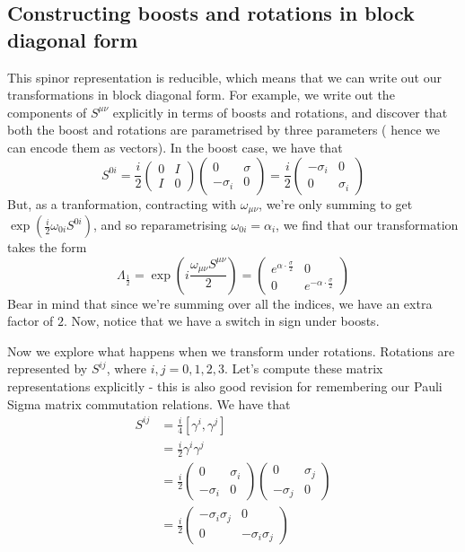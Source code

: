 \subsection{Constructing boosts and rotations in block diagonal form} 
This spinor representation is reducible, which means that we can write out our transformations in block diagonal form. For example, we write out the components of $S^{ \mu \nu } $ explicitly in terms of boosts and rotations, and discover that both the boost and rotations are parametrised by three parameters ( hence we can encode them as vectors). In the boost case, we have that \[ S^{ 0i } = \frac{ i }{2} \begin{pmatrix} 0 & I \\ I & 0 \end{pmatrix} \begin{pmatrix} 0 & \sigma \\ - \sigma_i & 0 \end{pmatrix}  = \frac{i}{2} \begin{pmatrix} - \sigma_i & 0 \\ 0 & \sigma_i \end{pmatrix} \] But, as a tranformation, contracting with $ \omega_{ \mu \nu} $, we're only summing to get $\exp ( \frac{i }{2} \omega_{ 0i }S^{ 0i } )$, and so reparametrising $\omega_{ 0i } = \alpha_i$, we find that our transformation takes the form 
\[ \Lambda_{ \frac{1}{2}}  = \exp \left(i \frac{ \omega_{ \mu \nu} S^{\mu \nu}}{2} \right)  = \begin{pmatrix} e^{ \alpha \cdot \frac{ \sigma}{2} } & 0 \\ 0 & e^{  - \alpha \cdot \frac{\sigma}{2}} \end{pmatrix} \] 
Bear in mind that since we're summing over all the indices, we have an extra factor of $2$. Now, notice that we have a switch in sign under boosts.   

Now we explore what happens when we transform under rotations. Rotations are represented by $S^{ij} $, where $i, j = 0, 1, 2, 3$. Let's compute these matrix representations explicitly - this is also good revision for remembering our Pauli Sigma matrix commutation relations. We have that 
\begin{align*} 
S^{ij}  & = \frac{ i}{4} [\gamma^i, \gamma^j ] \\ 
& = \frac{ i}{ 2} \gamma^i \gamma^j \\
& = \frac{ i}{2} \begin{pmatrix} 0 & \sigma_i \\ - \sigma_i & 0 \end{pmatrix} \begin{pmatrix} 0 & \sigma_j \\ - \sigma_j & 0 \end{pmatrix} \\ 
&= \frac{i}{2} \begin{pmatrix}  - \sigma_i \sigma_j & 0 \\ 0 &  - \sigma_i  \sigma_j \end{pmatrix} 
\end{align*} 

